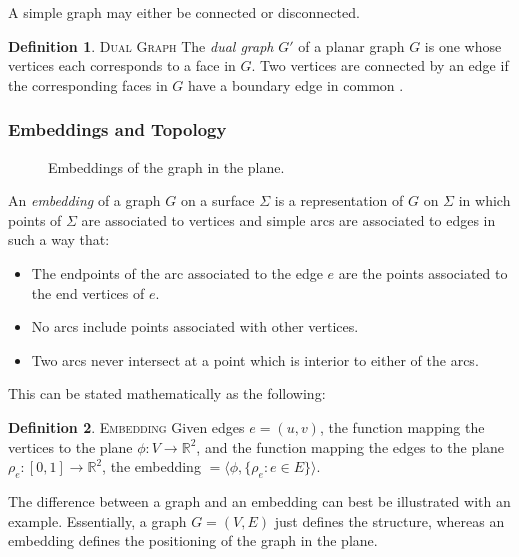 \documentclass[11pt]{article}
\newcommand{\R}{\mathbb{R}}
\theoremstyle{definition}
\newtheorem{definition}{Definition}[section]
\begin{document}
	A simple graph may either be connected or disconnected.
  
  	\theoremstyle{definition}
	\begin{definition}{\textsc{Dual Graph}}
		The \emph{dual graph} $G'$ of a planar graph $G$ is one whose vertices each corresponds to a face in $G$. 
		Two vertices are connected by an edge if the corresponding faces in $G$ have a boundary edge in common \cite{mathworld:dualGraph}. 
  	\end{definition}
	
\subsubsection{Embeddings and Topology}
    
    \begin{figure}%
		\centering
		\qquad
		\caption[]{Embeddings of the graph in the plane.}%
		\label{fig:embedding}
	\end{figure}
    
    	An \emph{embedding} of a graph $G$ on a surface $\Sigma$ is a representation of $G$ on $\Sigma$ in which points of $\Sigma$ are associated to vertices and simple arcs are associated to edges in such a way that:
  		\begin{itemize}
			\item The endpoints of the arc associated to the edge $e$ are the points associated to the end vertices of $e$.
			\item No arcs include points associated with other vertices.
			\item Two arcs never intersect at a point which is interior to either of the arcs.
  		\end{itemize}

	This can be stated mathematically as the following: 
	\theoremstyle{definition}
	\begin{definition}{\textsc{Embedding}}
		Given edges $e=(u,v)$, the function mapping the vertices to the plane $ \phi :V \rightarrow \R^2$, and the function mapping the edges to the plane $ \rho_e :[0,1] \rightarrow \R^2$, the embedding $= \langle \phi, \{\rho_e : e \in E \} \rangle$. 
	\end{definition}
		The difference between a graph and an embedding can best be illustrated with an example. 
		Essentially, a graph $G=(V,E)$ just defines the structure, whereas an embedding defines the positioning of the graph in the plane.
	
\end{document}
